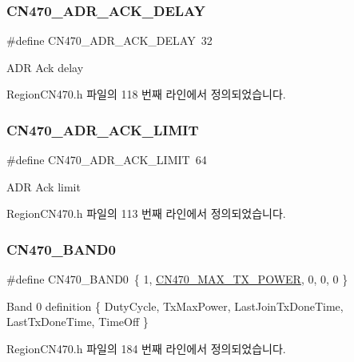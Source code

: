 \subsubsection{\texorpdfstring{C\+N470\+\_\+\+A\+D\+R\+\_\+\+A\+C\+K\+\_\+\+D\+E\+L\+AY}{CN470\_ADR\_ACK\_DELAY}}
{\footnotesize\ttfamily \#define C\+N470\+\_\+\+A\+D\+R\+\_\+\+A\+C\+K\+\_\+\+D\+E\+L\+AY~32}

A\+DR Ack delay 

Region\+C\+N470.\+h 파일의 118 번째 라인에서 정의되었습니다.

\mbox{\label{group___r_e_g_i_o_n_c_n470_gab622e938b7f31be68bbab0569252cc16}} 
\subsubsection{\texorpdfstring{C\+N470\+\_\+\+A\+D\+R\+\_\+\+A\+C\+K\+\_\+\+L\+I\+M\+IT}{CN470\_ADR\_ACK\_LIMIT}}
{\footnotesize\ttfamily \#define C\+N470\+\_\+\+A\+D\+R\+\_\+\+A\+C\+K\+\_\+\+L\+I\+M\+IT~64}

A\+DR Ack limit 

Region\+C\+N470.\+h 파일의 113 번째 라인에서 정의되었습니다.

\mbox{\label{group___r_e_g_i_o_n_c_n470_gaf6813f74ce73e4d0ab7971a89ab2ac2e}} 
\subsubsection{\texorpdfstring{C\+N470\+\_\+\+B\+A\+N\+D0}{CN470\_BAND0}}
{\footnotesize\ttfamily \#define C\+N470\+\_\+\+B\+A\+N\+D0~\{ 1, \mbox{\hyperlink{group___r_e_g_i_o_n_c_n470_gae977eb62cc9b2f49770b5f0d5ec1e5df}{C\+N470\+\_\+\+M\+A\+X\+\_\+\+T\+X\+\_\+\+P\+O\+W\+ER}}, 0, 0, 0 \}}

Band 0 definition \{ Duty\+Cycle, Tx\+Max\+Power, Last\+Join\+Tx\+Done\+Time, Last\+Tx\+Done\+Time, Time\+Off \} 

Region\+C\+N470.\+h 파일의 184 번째 라인에서 정의되었습니다.

